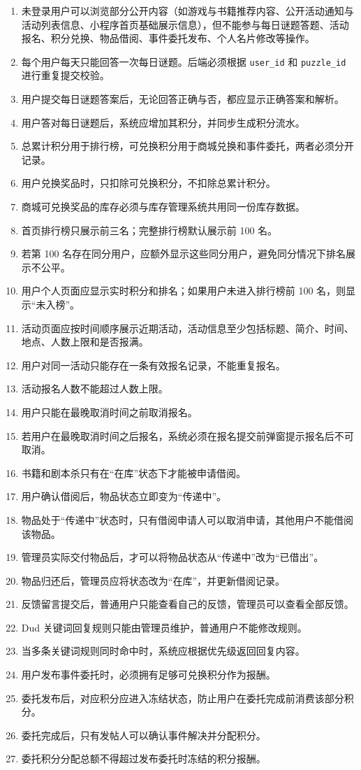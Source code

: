 \documentclass[a4paper,12pt]{article}
\begin{document}
\begin{enumerate}
    \item 未登录用户可以浏览部分公开内容（如游戏与书籍推荐内容、公开活动通知与活动列表信息、小程序首页基础展示信息），但不能参与每日谜题答题、活动报名、积分兑换、物品借阅、事件委托发布、个人名片修改等操作。
    \item 每个用户每天只能回答一次每日谜题。后端必须根据 \texttt{user\_id} 和 \texttt{puzzle\_id} 进行重复提交校验。
    \item 用户提交每日谜题答案后，无论回答正确与否，都应显示正确答案和解析。
    \item 用户答对每日谜题后，系统应增加其积分，并同步生成积分流水。
    \item 总累计积分用于排行榜，可兑换积分用于商城兑换和事件委托，两者必须分开记录。
    \item 用户兑换奖品时，只扣除可兑换积分，不扣除总累计积分。
    \item 商城可兑换奖品的库存必须与库存管理系统共用同一份库存数据。
    \item 首页排行榜只展示前三名；完整排行榜默认展示前 100 名。
    \item 若第 100 名存在同分用户，应额外显示这些同分用户，避免同分情况下排名展示不公平。
    \item 用户个人页面应显示实时积分和排名；如果用户未进入排行榜前 100 名，则显示“未入榜”。
    \item 活动页面应按时间顺序展示近期活动，活动信息至少包括标题、简介、时间、地点、人数上限和是否报满。
    \item 用户对同一活动只能存在一条有效报名记录，不能重复报名。
    \item 活动报名人数不能超过人数上限。
    \item 用户只能在最晚取消时间之前取消报名。
    \item 若用户在最晚取消时间之后报名，系统必须在报名提交前弹窗提示报名后不可取消。
    \item 书籍和剧本杀只有在“在库”状态下才能被申请借阅。
    \item 用户确认借阅后，物品状态立即变为“传递中”。
    \item 物品处于“传递中”状态时，只有借阅申请人可以取消申请，其他用户不能借阅该物品。
    \item 管理员实际交付物品后，才可以将物品状态从“传递中”改为“已借出”。
    \item 物品归还后，管理员应将状态改为“在库”，并更新借阅记录。
    \item 反馈留言提交后，普通用户只能查看自己的反馈，管理员可以查看全部反馈。
    \item Dud 关键词回复规则只能由管理员维护，普通用户不能修改规则。
    \item 当多条关键词规则同时命中时，系统应根据优先级返回回复内容。
    \item 用户发布事件委托时，必须拥有足够可兑换积分作为报酬。
    \item 委托发布后，对应积分应进入冻结状态，防止用户在委托完成前消费该部分积分。
    \item 委托完成后，只有发帖人可以确认事件解决并分配积分。
    \item 委托积分分配总额不得超过发布委托时冻结的积分报酬。
\end{enumerate}
\end{document}
